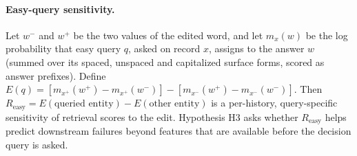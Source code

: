 \paragraph{Easy-query sensitivity.} Let $w^{-}$ and $w^{+}$ be the two values of the edited word, and
let $m_{x}(w)$ be the log probability that easy query $q$, asked on record $x$, assigns to the answer
$w$ (summed over its spaced, unspaced and capitalized surface forms, scored as answer prefixes). Define
$E(q) = [m_{x^{+}}(w^{+}) - m_{x^{+}}(w^{-})] - [m_{x^{-}}(w^{+}) - m_{x^{-}}(w^{-})]$. Then
$R_{\mathrm{easy}} = E(\text{queried entity}) - E(\text{other entity})$ is a per-history, query-specific
sensitivity of retrieval scores to the edit. Hypothesis H3 asks whether $R_{\mathrm{easy}}$ helps predict
downstream failures beyond features that are available before the decision query is asked.
